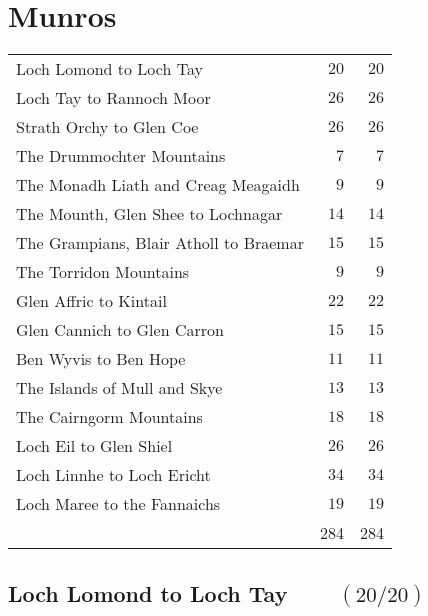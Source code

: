\documentclass[10pt,a4paper]{article}
\begin{document}
\section*{Munros}%
\begin{tabular}{lrr}
Loch Lomond to Loch Tay &$20$&$20$\\
Loch Tay to Rannoch Moor &$26$&$26$\\
Strath Orchy to Glen Coe &$26 $&$26$\\
The Drummochter Mountains &$7 $&$7$\\
The Monadh Liath and Creag Meagaidh &$9 $&$9$\\
The Mounth, Glen Shee to Lochnagar &$14$&$14$\\
The Grampians, Blair Atholl to Braemar &$15$&$15$\\
The Torridon Mountains &$9$&$9$\\
Glen Affric to Kintail &$22$&$22$\\
Glen Cannich to Glen Carron  &$15$&$15$\\
Ben Wyvis to Ben Hope &$11$&$11$\\
The Islands of Mull and Skye &$13$&$13$\\
The Cairngorm Mountains &$18$&$18$\\
Loch Eil to Glen Shiel &$26$&$26$\\
Loch Linnhe to Loch Ericht &$34$&$34$\\
Loch Maree to the Fannaichs  &$19$&$19$\\
&284&284
\end{tabular}
\newpage

\subsection*{Loch Lomond to Loch Tay $\qquad (20/20)$}
\end{document}

